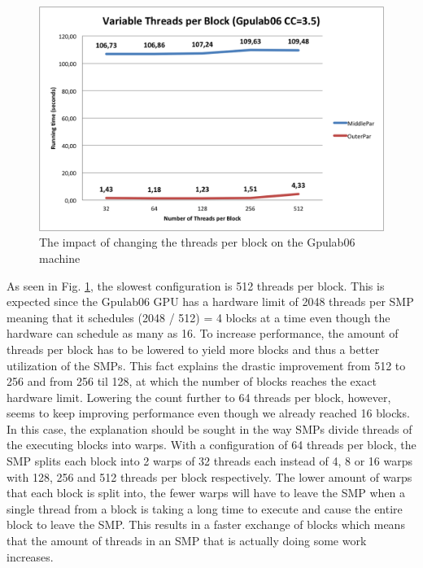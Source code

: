 \begin{figure}[t]
\begin{center}
	\includegraphics[scale=0.5]{img/Gpulab-tpb35.png}
\end{center}
\caption{The impact of changing the threads per block on the Gpulab06 machine}
\label{ThreadsPerBlockGraph}
\end{figure}
\FloatBarrier

\noindent As seen in Fig. \ref{ThreadsPerBlockGraph}, the slowest configuration is 512 threads per block. This is expected since the Gpulab06 GPU has a hardware limit of 2048 threads per SMP meaning that it schedules (2048 / 512) = 4 blocks at a time even though the hardware can schedule as many as 16. To increase performance, the amount of threads per block has to be lowered to yield more blocks and thus a better utilization of the SMPs. This fact explains the drastic improvement from 512 to 256 and from 256 til 128, at which the number of blocks reaches the exact hardware limit. Lowering the count further to 64 threads per block, however, seems to keep improving performance even though we already reached 16 blocks. \\

In this case, the explanation should be sought in the way SMPs divide threads of the executing blocks into warps. With a configuration of 64 threads per block, the SMP splits each block into 2 warps of 32 threads each instead of 4, 8 or 16 warps with 128, 256 and 512 threads per block respectively. The lower amount of warps that each block is split into, the fewer warps will have to leave the SMP when a single thread from a block is taking a long time to execute and cause the entire block to leave the SMP. This results in a faster exchange of blocks which means that the amount of threads in an SMP that is actually doing some work increases. \\

